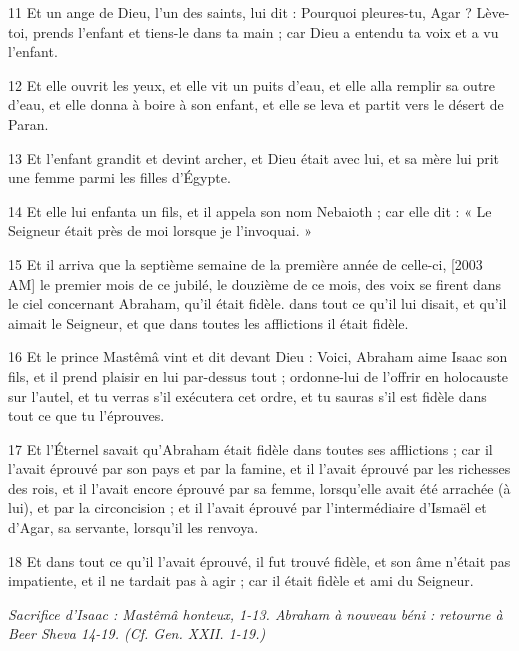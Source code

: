 \par 11 Et un ange de Dieu, l'un des saints, lui dit : Pourquoi pleures-tu, Agar ? Lève-toi, prends l’enfant et tiens-le dans ta main ; car Dieu a entendu ta voix et a vu l'enfant.
\par 12 Et elle ouvrit les yeux, et elle vit un puits d'eau, et elle alla remplir sa outre d'eau, et elle donna à boire à son enfant, et elle se leva et partit vers le désert de Paran.
\par 13 Et l'enfant grandit et devint archer, et Dieu était avec lui, et sa mère lui prit une femme parmi les filles d'Égypte.
\par 14 Et elle lui enfanta un fils, et il appela son nom Nebaioth ; car elle dit : « Le Seigneur était près de moi lorsque je l'invoquai. »
\par 15 Et il arriva que la septième semaine de la première année de celle-ci, [2003 AM] le premier mois de ce jubilé, le douzième de ce mois, des voix se firent dans le ciel concernant Abraham, qu'il était fidèle. dans tout ce qu'il lui disait, et qu'il aimait le Seigneur, et que dans toutes les afflictions il était fidèle.
\par 16 Et le prince Mastêmâ vint et dit devant Dieu : Voici, Abraham aime Isaac son fils, et il prend plaisir en lui par-dessus tout ; ordonne-lui de l'offrir en holocauste sur l'autel, et tu verras s'il exécutera cet ordre, et tu sauras s'il est fidèle dans tout ce que tu l'éprouves.
\par 17 Et l'Éternel savait qu'Abraham était fidèle dans toutes ses afflictions ; car il l'avait éprouvé par son pays et par la famine, et il l'avait éprouvé par les richesses des rois, et il l'avait encore éprouvé par sa femme, lorsqu'elle avait été arrachée (à lui), et par la circoncision ; et il l'avait éprouvé par l'intermédiaire d'Ismaël et d'Agar, sa servante, lorsqu'il les renvoya.
\par 18 Et dans tout ce qu'il l'avait éprouvé, il fut trouvé fidèle, et son âme n'était pas impatiente, et il ne tardait pas à agir ; car il était fidèle et ami du Seigneur.


\par \textit{Sacrifice d'Isaac : Mastêmâ honteux, 1-13. Abraham à nouveau béni : retourne à Beer Sheva 14-19. (Cf. Gen. XXII. 1-19.)}

